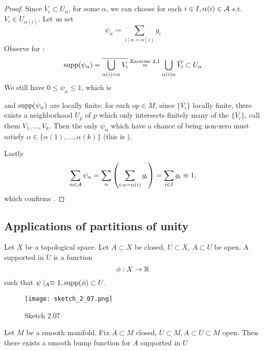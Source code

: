 \begin{proof}
     Since \(\tilde{V_i}\subset U_\alpha\), for some \(\alpha\), we can choose for each \(i\in I, \alpha(i)\in \mathcal{A}\) s.t. \(V_i\in U_{\alpha(i)}\).
    Let us set \[\psi_{\alpha}\coloneqq \sum_{i\mid \alpha=\alpha(i)}g_i\]
    Observe for : \[\text{supp}(\psi_\alpha)=\overline{\bigcup_{\alpha(i)=\alpha} V_i}\stackrel{\text{Exercise 2.1}}{=}\bigcup_{\alpha(i)\alpha}\overline{V_i}\subset U_\alpha\]
    We still have \(0\leq \psi_\alpha\leq 1\), which is 
    
    and 
    \(\text{supp}(\psi_\alpha)\) are locally finite: for each \(op\in M\), since \(\{\overline{V_i}\}\) locally finite,
    there exists a neighborhood \(U_p\) of \(p\)  which only intersects finitely many of the \(\{\overline{V_i}\}\), call 
    them \(V_1,\dots,V_k\). Then the only \(\psi_\alpha\) which have a chance of being non-zero must satisfy \(\alpha\in\{\alpha(1),\dots,\alpha(k)\}\) (this is ).

    Lastly \[\sum_{\alpha\in\mathcal{A}}\psi_\alpha=\sum_{\alpha}\left(\sum_{i: \alpha=\alpha(i)} g_i\right)=\sum_{i\in I} g_i\equiv 1,\]
    which confirms .

\end{proof}


\subsection{Applications of partitions of unity}

\begin{definition*}
    Let \(X\) be a topological space. Let \(A\subset X\) be closed, \(U\subset X\), \(A\subset U\) be open. 
    A  supported in \(U\) is a function \[\phi:X\to\mathbb{R}\]
    such that \(\psi\mid_A \equiv1, \text{supp}(\phi)\subset U\). 
\end{definition*}

\begin{figure}[H]
    \centering
    \texttt{[image: sketch\_2\_07.png]}
    \caption{Sketch 2.07}
\end{figure}

\begin{proposition}\label{prop:2.8}
    Let \(M\) be a smooth manifold. Fix \(A\subset M\) closed, \(U\subset M,A\subset U\subset M\) open.
    Then there exists a smooth bump function for \(A\) supported in \(U\)
\end{proposition}

